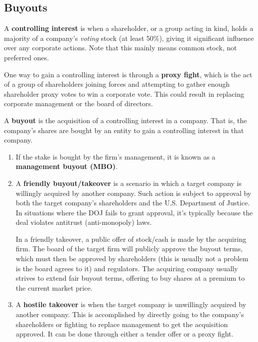 \documentclass{article}
\begin{document}
  \subsection{Buyouts}

    \begin{definition}
      A \textbf{controlling interest} is when a shareholder, or a group acting in kind, holds a majority of a company's \textit{voting} stock (at least 50\%), giving it significant influence over any corporate actions. Note that this mainly means common stock, not preferred ones. 
    \end{definition}

    \begin{definition}
      One way to gain a controlling interest is through a \textbf{proxy fight}, which is the act of a group of shareholders joining forces and attempting to gather enough shareholder proxy votes to win a corporate vote. This could result in replacing corporate management or the board of directors. 
    \end{definition}

    \begin{definition}[Buyout]
      A \textbf{buyout} is the acquisition of a controlling interest in a company. That is, the company's shares are bought by an entity to gain a controlling interest in that company.  
      \begin{enumerate}
        \item If the stake is bought by the firm's management, it is known as a \textbf{management buyout (MBO)}.
        \item A \textbf{friendly buyout/takeover} is a scenario in which a target company is willingly acquired by another company. Such action is subject to approval by both the target company's shareholders and the U.S. Department of Justice. In situations where the DOJ fails to grant approval, it's typically because the deal violates antitrust (anti-monopoly) laws. 
        
        In a friendly takeover, a public offer of stock/cash is made by the acquiring firm. The board of the target firm will publicly approve the buyout terms, which must then be approved by shareholders (this is usually not a problem is the board agrees to it) and regulators. The acquiring company usually strives to extend fair buyout terms, offering to buy shares at a premium to the current market price.
        \item A \textbf{hostile takeover} is when the target company is unwillingly acquired by another company. This is accomplished by directly going to the company's shareholders or fighting to replace management to get the acquisition approved. It can be done through either a tender offer or a proxy fight. 
      \end{enumerate}
    \end{definition}
\end{document}
